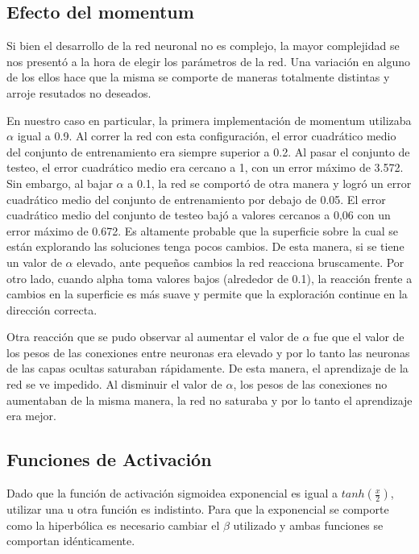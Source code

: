 \documentclass[11pt]{article}
\begin{document}
    \subsection{Efecto del momentum}
    \par Si bien el desarrollo de la red neuronal no es complejo, la mayor complejidad se nos presentó a la hora de elegir los parámetros de la red. Una variación en alguno de los ellos hace que la misma se comporte de maneras totalmente distintas y arroje resutados no deseados.
    \par En nuestro caso en particular, la primera implementación de momentum utilizaba \begin{math}\alpha\end{math} igual a 0.9. Al correr la red con esta configuración, el error cuadrático medio del conjunto de entrenamiento era siempre superior a 0.2. Al pasar el conjunto de testeo, el error cuadrático medio era cercano a 1, con un error máximo de 3.572. Sin embargo, al bajar \begin{math}\alpha\end{math} a 0.1, la red se comportó de otra manera y logró un error cuadrático medio del conjunto de entrenamiento por debajo de 0.05. El error cuadrático medio del conjunto de testeo bajó a valores cercanos a 0,06 con un error máximo de 0.672.
    Es altamente probable que la superficie sobre la cual se están explorando las soluciones tenga pocos cambios. De esta manera, si se tiene un valor de \begin{math}\alpha\end{math} elevado, ante pequeños cambios la red reacciona bruscamente. Por otro lado, cuando alpha toma valores bajos (alrededor de 0.1), la reacción frente a cambios en la superficie es más suave y permite que la exploración continue en la dirección correcta.
    \par Otra reacción que se pudo observar al aumentar el valor de \begin{math}\alpha\end{math} fue que el valor de los pesos de las conexiones entre neuronas era elevado y por lo tanto las neuronas de las capas ocultas saturaban rápidamente. De esta manera, el aprendizaje de la red se ve impedido. Al disminuir el valor de \begin{math}\alpha\end{math}, los pesos de las conexiones no aumentaban de la misma manera, la red no saturaba y por lo tanto el aprendizaje era mejor.
    \subsection{Funciones de Activación}
    \par Dado que la función de activación sigmoidea exponencial es igual a \begin{math} tanh(\frac{x}{2})\end{math}, utilizar una u otra función es indistinto. Para que la exponencial se comporte como la hiperbólica es necesario cambiar el $\beta$ utilizado y ambas funciones se comportan idénticamente.
\end{document}
